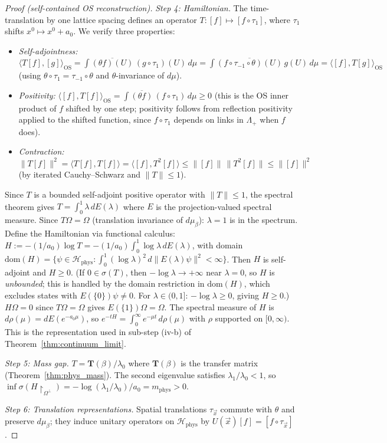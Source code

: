 \documentclass[11pt,a4paper]{amsart}
\theoremstyle{definition}
\begin{document}
\begin{proof}[Proof (self-contained OS reconstruction)]
\emph{Step 4: Hamiltonian.}
The time-translation by one lattice spacing defines an operator
$T : [f] \mapsto [f\circ\tau_1]$, where $\tau_1$ shifts $x^0 \mapsto x^0+a_0$.
We verify three properties:
\begin{itemize}
\item \emph{Self-adjointness:} $\langle T[f],[g]\rangle_{\mathrm{OS}}
  = \int \overline{(\theta f)(U)}\,(g\circ\tau_1)(U)\,d\mu
  = \int \overline{(f\circ\tau_{-1}\circ\theta)(U)}\,g(U)\,d\mu
  = \langle [f],T[g]\rangle_{\mathrm{OS}}$
  (using $\theta\circ\tau_1 = \tau_{-1}\circ\theta$ and $\theta$-invariance of $d\mu$).
\item \emph{Positivity:} $\langle [f], T[f]\rangle_{\mathrm{OS}}
  = \int \overline{(\theta f)}\,(f\circ\tau_1)\,d\mu \ge 0$
  (this is the OS inner product of $f$ shifted by one step; positivity follows
  from reflection positivity applied to the shifted function, since
  $f\circ\tau_1$ depends on links in $\Lambda_+$ when $f$ does).
\item \emph{Contraction:} $\|T[f]\|^2 = \langle T[f],T[f]\rangle
  = \langle [f], T^2[f]\rangle \le \|[f]\|\,\|T^2[f]\| \le \|[f]\|^2$
  (by iterated Cauchy--Schwarz and $\|T\| \le 1$).
\end{itemize}
Since $T$ is a bounded self-adjoint positive operator with $\|T\| \le 1$,
the spectral theorem gives $T = \int_0^1 \lambda\, dE(\lambda)$ where $E$ is
the projection-valued spectral measure.  Since $T\Omega = \Omega$ (translation
invariance of $d\mu_\beta$): $\lambda = 1$ is in the spectrum.
Define the Hamiltonian via functional calculus:
$H := -(1/a_0)\log T = -(1/a_0)\int_0^1 \log\lambda\,dE(\lambda)$,
with domain $\mathrm{dom}(H) = \{{\psi \in \mathcal{H}_{\mathrm{phys}} :
\int_0^1 (\log\lambda)^2\,d\|E(\lambda)\psi\|^2 < \infty}\}$.
Then $H$ is self-adjoint and $H \ge 0$.
(If $0 \in \sigma(T)$, then $-\log\lambda \to +\infty$ near $\lambda = 0$,
so $H$ is \emph{unbounded}; this is handled by the domain restriction in
$\mathrm{dom}(H)$, which excludes states with $E(\{0\})\psi \ne 0$.
For $\lambda \in (0,1]$: $-\log\lambda \ge 0$, giving $H \ge 0$.)
$H\Omega = 0$ since $T\Omega = \Omega$ gives $E(\{1\})\Omega = \Omega$.
The spectral measure of $H$ is $d\rho(\mu) = dE(e^{-a_0\mu})$,
so $e^{-tH} = \int_0^\infty e^{-\mu t}\,d\rho(\mu)$ with $\rho$
supported on $[0,\infty)$.  This is the representation used in sub-step (iv-b)
of Theorem~\ref{thm:continuum_limit}.

\emph{Step 5: Mass gap.}
$T = \mathbf{T}(\beta)/\lambda_0$ where $\mathbf{T}(\beta)$ is the transfer
matrix (Theorem~\ref{thm:phys_mass}).  The second eigenvalue satisfies
$\lambda_1/\lambda_0 < 1$, so $\inf\sigma(H\restriction_{\Omega^\perp})
= -\log(\lambda_1/\lambda_0)/a_0 = m_{\mathrm{phys}} > 0$.

\emph{Step 6: Translation representations.}
Spatial translations $\tau_{\vec x}$ commute with $\theta$ and preserve
$d\mu_\beta$; they induce unitary operators on $\mathcal{H}_{\mathrm{phys}}$
by $U(\vec x)[f] = [f\circ\tau_{\vec x}]$.
\end{proof}
\end{document}
